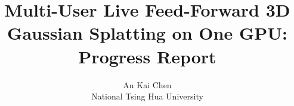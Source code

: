 \documentclass[letterpaper,twocolumn,10pt]{article}
\begin{document}
\date{}

\title{\Large \bf Multi-User Live Feed-Forward 3D Gaussian Splatting on One GPU:\\ Progress Report}

\author{
{\rm An Kai Chen}\\
National Tsing Hua University
}

\maketitle












\end{document}
